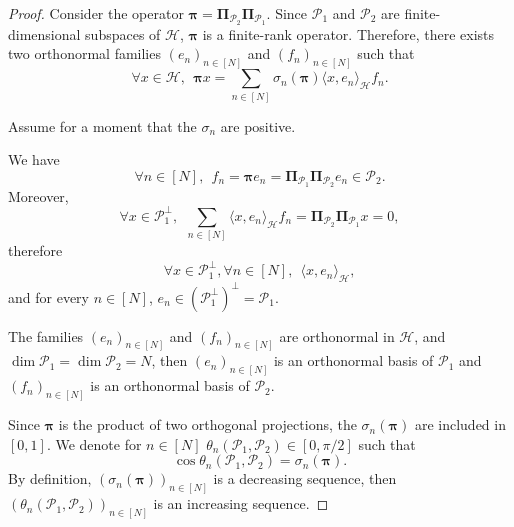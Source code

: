 \documentclass[twoside,11pt]{book}
\numberwithin{theorem}{chapter}
\numberwithin{definition}{chapter}
\numberwithin{proposition}{chapter}
\numberwithin{corollary}{chapter}
\numberwithin{example}{chapter}
\numberwithin{lemma}{chapter}
\numberwithin{assumption}{chapter}
\begin{document}
\begin{proof}
Consider the operator $\bm{\pi} = \bm{\Pi}_{\mathcal{P}_2} \bm{\Pi}_{\mathcal{P}_1}$. Since $\mathcal{P}_1$ and $\mathcal{P}_2$ are finite-dimensional subspaces of $\mathcal{H}$, $\bm{\pi}$ is a finite-rank operator. Therefore, there exists two orthonormal families $(e_{n})_{n \in [N]}$ and $(f_{n})_{n \in [N]}$ such that
\begin{equation}
\forall x \in \mathcal{H}, \:\: \bm{\pi} x = \sum\limits_{n \in [N]} \sigma_{n}(\bm{\pi}) \langle x,e_{n} \rangle_{\mathcal{H}} f_{n}.
\end{equation} 


Assume for a moment that the $\sigma_n$ are positive. 

We have 
\begin{equation}
\forall n \in [N], \:\: f_{n} = \bm{\pi} e_{n} = \bm{\Pi}_{\mathcal{P}_1} \bm{\Pi}_{\mathcal{P}_2} e_{n} \in \mathcal{P}_2.
\end{equation}
Moreover, 
\begin{equation}
\forall x \in \mathcal{P}_1^{\perp}, \:\: \sum\limits_{n \in [N]} \langle x,e_{n} \rangle_{\mathcal{H}}f_{n} = \bm{\Pi}_{\mathcal{P}_2} \bm{\Pi}_{\mathcal{P}_1} x =0,
\end{equation}
therefore
\begin{equation}
\forall x \in \mathcal{P}_1^{\perp}, \forall n \in [N],  \:\: \langle x,e_{n} \rangle_{\mathcal{H}},
\end{equation}
and for every $n \in [N]$, $e_{n} \in (\mathcal{P}_1^{\perp})^{\perp} = \mathcal{P}_1$. 

The families $(e_{n})_{n \in [N]}$ and $(f_{n})_{n \in [N]}$ are orthonormal in $\mathcal{H}$, and $\dim \mathcal{P}_{1} = \dim \mathcal{P}_{2} = N$, then $(e_{n})_{n \in [N]}$ is an orthonormal basis of $\mathcal{P}_{1}$ and $(f_{n})_{n \in [N]}$ is an orthonormal basis of $\mathcal{P}_{2}$.

Since $\bm{\pi}$ is the product of two orthogonal projections, the $\sigma_{n}(\bm{\pi})$ are included in $[0,1]$. We denote for $n \in [N]$ $\theta_{n}(\mathcal{P}_1,\mathcal{P}_2) \in [0,\pi/2]$ such that
\begin{equation}
\cos \theta_n(\mathcal{P}_1,\mathcal{P}_2) = \sigma_{n}(\bm{\pi}).
\end{equation}
By definition, $(\sigma_{n}(\bm{\pi}))_{n \in [N]}$ is a decreasing sequence, then $(\theta_{n}(\mathcal{P}_1,\mathcal{P}_2))_{n \in [N]}$ is an increasing sequence. 


\end{proof}
\end{document}
